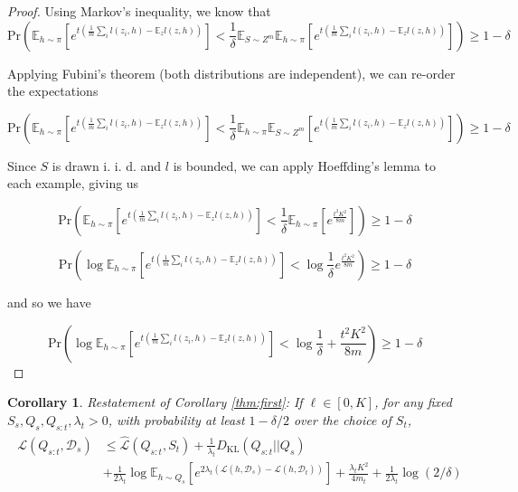 \documentclass{article}
\theoremstyle{plain}
\newtheorem{corollary}[theorem]{Corollary}
\theoremstyle{definition}
\theoremstyle{remark}
\begin{document}
\begin{proof} 
	Using Markov's inequality, we know that 
	$$\textrm{Pr}\left (\mathbb{E}_{h\sim \pi}\left [e^{t(\frac{1}{m}\sum_i l(z_i,h)-\mathbb{E}_{z}l(z,h))}\right ]<\frac{1}{\delta}\mathbb{E}_{S\sim Z^m}\mathbb{E}_{h\sim \pi}\left [e^{t(\frac{1}{m}\sum_i l(z_i,h)-\mathbb{E}_{z}l(z,h))}\right ] \right ) \geq 1-\delta$$
	
	Applying Fubini's theorem (both distributions are independent), we can re-order the expectations
	
	$$\textrm{Pr}\left (\mathbb{E}_{h\sim \pi}\left [e^{t(\frac{1}{m}\sum_i l(z_i,h)-\mathbb{E}_{z}l(z,h))}\right ]<\frac{1}{\delta}\mathbb{E}_{h\sim \pi}\mathbb{E}_{S\sim Z^m}\left [e^{t(\frac{1}{m}\sum_i l(z_i,h)-\mathbb{E}_{z}l(z,h))}\right ] \right ) \geq 1-\delta$$
	
	Since $S$ is drawn i.\! i.\! d.\! and $l$ is bounded, we can apply Hoeffding's lemma to each example, giving us
	
	$$\textrm{Pr}\left (\mathbb{E}_{h\sim \pi}\left [e^{t(\frac{1}{m}\sum_i l(z_i,h)-\mathbb{E}_{z}l(z,h))}\right ]<\frac{1}{\delta}\mathbb{E}_{h\sim \pi}\left [e^{\frac{t^2K^2}{8m}}\right ] \right ) \geq 1-\delta$$
	
	$$\textrm{Pr}\left (\log\mathbb{E}_{h\sim \pi}\left [e^{t(\frac{1}{m}\sum_i l(z_i,h)-\mathbb{E}_{z}l(z,h))}\right ]<\log\frac{1}{\delta}e^{\frac{t^2K^2}{8m}} \right ) \geq 1-\delta$$
	
	and so we have 
	
	$$\textrm{Pr}\left (\log\mathbb{E}_{h\sim \pi}\left [e^{t(\frac{1}{m}\sum_i l(z_i,h)-\mathbb{E}_{z}l(z,h))}\right ]<\log\frac{1}{\delta}+\frac{t^2K^2}{8m} \right ) \geq 1-\delta$$
	
\end{proof}


\begin{corollary} Restatement of Corollary \ref{thm:first}:
If $\ell\in [0,K]$, for any fixed $S_s,Q_s,Q_{s:t},\lambda_t>0$, with probability at least $1-\delta/2$ over the choice of $S_t$,
\begin{align}
\begin{split}
\mathcal{L}(Q_{s:t}, \mathcal{D}_s) &\leq \hat{\mathcal{L}}(Q_{s:t}, S_t) + \frac{1}{\lambda_t} D_{\mathrm{KL}}(Q_{s:t}||Q_{s})\\
&+\frac{1}{2\lambda_t}\log \mathbb{E}_{h\sim Q_{s}}\left [e^{2\lambda_t(\mathcal{L}(h,\mathcal{D}_s)-\mathcal{L}(h,\mathcal{D}_t))}\right ]+\frac{\lambda_t K^2}{4m_t}+\frac{1}{2\lambda_t}\log(2/\delta)
\end{split}
\end{align}
\end{corollary}
\end{document}
